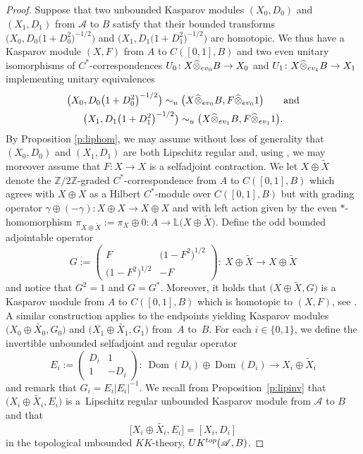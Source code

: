 \documentclass[11pt]{article}
\numberwithin{equation}{section}
\newcommand{\hot}{\widehat \otimes}
\newcommand{\op}{\oplus}
\newcommand{\zz}{\mathbb{Z}}
\newcommand{\ga}{\gamma}
\newcommand{\s}[1]{\mathscr{#1}}
\newcommand{\B}[1]{\mathbb{#1}}
\newcommand{\wit}{\widetilde}
\begin{document}
\begin{proof}
Suppose that two unbounded Kasparov modules $(X_0,D_0)$ and $(X_1,D_1)$ from $\s A$ to $B$ satisfy that their bounded transforms $\big(X_0, D_0\big(1 + D_0^2\big)^{-1/2}\big)$ and $\big(X_1,D_1\big(1 + D_1^2\big)^{-1/2}\big)$ are homotopic. We thus have a Kasparov module $(X,F)$ from $A$ to $C([0,1],B)$ and two even unitary isomorphisms of $C^*$-correspondences $U_0\colon X \hot_{{\rm ev}_0} B \to X_0$ and $U_1\colon X \hot_{{\rm ev}_1} B \to X_1$ implementing unitary equivalences
\begin{gather*}
 \big(X_0, D_0 \big(1 + D_0^2\big)^{-1/2}\big) \sim_u \big(X \hot_{{\rm ev}_0} B, F \hot_{{\rm ev}_0} 1\big) \qquad \text{and} \\
 \big(X_1, D_1 \big(1 + D_1^2\big)^{-1/2}\big) \sim_u \big(X \hot_{{\rm ev}_1} B, F \hot_{{\rm ev}_1} 1\big) .
\end{gather*}
By Proposition \ref{p:liphom}, we may assume without loss of generality that $(X_0,D_0)$ and $(X_1,D_1)$ are both Lipschitz regular and, using \cite[Proposition~17.4.3]{Bla:KOA}, we may moreover assume that \mbox{$F\colon X \to X$} is a selfadjoint contraction. We let $X \op \wit X$ denote the $\zz/2\zz$-graded $C^*$-cor\-respon\-dence from $A$ to $C( [0,1],B)$ which agrees with $X \op X$ as a Hilbert $C^*$-module over $C([0,1],B)$ but with grading operator $\ga \op (-\ga)\colon X \op X \to X \op X$ and with left action given by the even $*$-homomorphism $\pi_{X \op \wit X} := \pi_X \op 0\colon A \to \B L\big(X \op \wit X\big)$. Define the odd bounded adjointable operator
\[
G := \left(\begin{matrix} F & \big(1 - F^2\big)^{1/2} \\ \big(1 - F^2\big)^{1/2} & - F\end{matrix}\right) \colon \ X \op \wit X \to X \op \wit X
\]
and notice that $G^2 = 1$ and $G = G^*$. Moreover, it holds that $\big(X \op \wit X, G\big)$ is a Kasparov module from $A$ to $C( [0,1],B)$ which is homotopic to $(X,F)$, see \cite[Section~17.6]{Bla:KOA}. A similar construction applies to the endpoints yielding Kasparov modules $\big(X_0 \op \wit{X_0}, G_0\big)$ and $\big(X_1 \op \wit{X_1}, G_1\big)$ from~$A$ to~$B$. For each $i \in \{0,1\}$, we define the invertible unbounded selfadjoint and regular operator
\[
E_i := \left(\begin{matrix} D_i & 1 \\ 1 & - D_i\end{matrix}\right) \colon \ \operatorname{Dom}(D_i) \op \operatorname{Dom}(D_i) \to X_i \op \wit X_i
\]
and remark that $G_i = E_i |E_i|^{-1}$. We recall from Proposition~\ref{p:lipinv} that $\big(X_i \op \wit{X_i}, E_i\big)$ is a~Lipschitz regular unbounded Kasparov module from $\s A$ to $B$ and that{\samepage
\[
\big[ X_i \op \wit{X_i}, E_i\big] = [X_i , D_i]
\]
in the topological unbounded $KK$-theory, $UK^{{\rm top}}(\s A,B)$.}


\end{proof}
\end{document}
